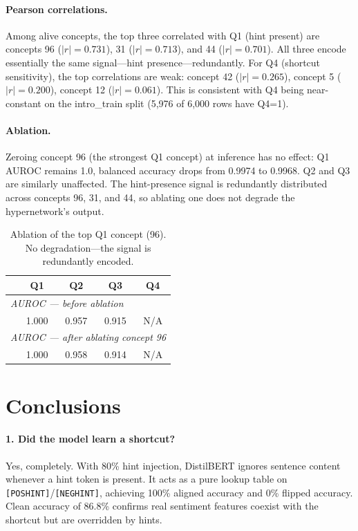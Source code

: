 \documentclass{article}
\begin{document}
\paragraph{Pearson correlations.} Among alive concepts, the top three correlated with Q1 (hint present) are concepts 96 ($|r|=0.731$), 31 ($|r|=0.713$), and 44 ($|r|=0.701$). All three encode essentially the same signal---hint presence---redundantly. For Q4 (shortcut sensitivity), the top correlations are weak: concept 42 ($|r|=0.265$), concept 5 ($|r|=0.200$), concept 12 ($|r|=0.061$). This is consistent with Q4 being near-constant on the intro\_train split (5{,}976 of 6{,}000 rows have Q4=1).

\paragraph{Ablation.} Zeroing concept 96 (the strongest Q1 concept) at inference has no effect: Q1 AUROC remains 1.0, balanced accuracy drops from 0.9974 to 0.9968. Q2 and Q3 are similarly unaffected. The hint-presence signal is redundantly distributed across concepts 96, 31, and 44, so ablating one does not degrade the hypernetwork's output.

\begin{table}[h]
\centering
\small
\begin{tabular}{lcccc}
\toprule
& \textbf{Q1} & \textbf{Q2} & \textbf{Q3} & \textbf{Q4} \\
\midrule
\multicolumn{5}{l}{\textit{AUROC --- before ablation}} \\
& 1.000 & 0.957 & 0.915 & N/A \\
\multicolumn{5}{l}{\textit{AUROC --- after ablating concept 96}} \\
& 1.000 & 0.958 & 0.914 & N/A \\
\bottomrule
\end{tabular}
\caption{Ablation of the top Q1 concept (96). No degradation---the signal is redundantly encoded.}
\label{tab:ablation}
\end{table}

\section{Conclusions}
\label{sec:conclusions}

\paragraph{1. Did the model learn a shortcut?} Yes, completely. With 80\% hint injection, DistilBERT ignores sentence content whenever a hint token is present. It acts as a pure lookup table on \texttt{[POSHINT]}/\texttt{[NEGHINT]}, achieving 100\% aligned accuracy and 0\% flipped accuracy. Clean accuracy of 86.8\% confirms real sentiment features coexist with the shortcut but are overridden by hints.
\end{document}
